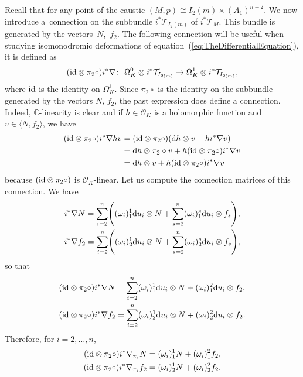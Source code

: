 \documentclass[10pt,a4paper]{amsart}
\numberwithin{equation}{section}
\begin{document}
 Recall that for any point of the caustic $(M,p)\cong I_{2}(m)\times(A_{1})^{n-2}$. We now introduce a~connection on the subbundle $i^{*}\mathcal{T}_{I_{2}(m)}$ of $i^{*}\mathcal{T}_{M}$. This bundle is generated by the vectors~$N$,~$f_{2}$. The following connection will be useful when studying isomonodromic deformations of equation~(\ref{eq:TheDifferentialEquation}), it is defined as
 \begin{equation*}
 ({\rm id}\otimes\pi_{2}\circ)i^{*}\nabla\colon \ \Omega^{0}_{K}\otimes i^{*}\mathcal{T}_{I_{2(m)}}\rightarrow\Omega^{1}_{K}\otimes i^{*}\mathcal{T}_{I_{2(m)}},
 \end{equation*}
 where ${\rm id}$ is the identity on $\Omega^{1}_{K}$. Since $\pi_{2}\circ$ is the identity on the subbundle generated by the vectors $N$, $f_{2}$, the past expression does define a connection. Indeed, $\mathbb{C}$-linearity is clear and if $h\in\mathcal{O}_{K}$ is a holomorphic function and $v\in \langle N,f_{2}\rangle$, we have
 \begin{align*}
 ({\rm id}\otimes\pi_{2}\circ)i^{*}\nabla hv& =({\rm id}\otimes\pi_{2}\circ)({\rm d}h\otimes v+hi^{*}\nabla v)\\
 & ={\rm d}h\otimes\pi_{2}\circ v+h({\rm id}\otimes\pi_{2}\circ)i^{*}\nabla v\\
 & ={\rm d}h\otimes v+h({\rm id}\otimes\pi_{2}\circ)i^{*}\nabla v
 \end{align*}
 because $({\rm id}\otimes\pi_{2}\circ)$ is $\mathcal{O}_{K}$-linear. Let us compute the connection matrices of this connection. We have
 \begin{align*}
 & i^{*}\nabla N=\sum_{i=2}^{n}\Biggl((\omega_{i})_{1}^{1}{\rm d}u_{i}\otimes N+\sum_{s=2}^{n}(\omega_{i})^{s}_{1}{\rm d}u_{i}\otimes f_{s}\Biggr),\\
 & i^{*}\nabla f_{2}=\sum_{i=2}^{n}\Biggl((\omega_{i})_{2}^{1}{\rm d}u_{i}\otimes N+\sum_{s=2}^{n}(\omega_{i})^{s}_{2}{\rm d}u_{i}\otimes f_{s}\Biggr),
 \end{align*}
 so that
 \begin{align*}
 & ({\rm id}\otimes\pi_{2}\circ)i^{*}\nabla N=\sum_{i=2}^{n}(\omega_{i})^{1}_{1}{\rm d}u_{i}\otimes N+(\omega_{i})^{2}_{1}{\rm d}u_{i}\otimes f_{2},\\
 & ({\rm id}\otimes\pi_{2}\circ)i^{*}\nabla f_{2}=\sum_{i=2}^{n}(\omega_{i})^{1}_{2}{\rm d}u_{i}\otimes N+(\omega_{i})^{2}_{2}{\rm d}u_{i}\otimes f_{2}.
 \end{align*}
 Therefore, for $i=2,\dots,n$,
 \begin{equation*}
 \begin{aligned}
 ({\rm id}\otimes\pi_{2}\circ)i^{*}\nabla_{\pi_{i}}N&=(\omega_{i})^{1}_{1}N+(\omega_{i})^{2}_{1}f_{2},\\
 ({\rm id}\otimes\pi_{2}\circ)i^{*}\nabla_{\pi_{i}}f_{2}&=(\omega_{i})^{1}_{2}N+(\omega_{i})^{2}_{2}f_{2}.
 \end{aligned}
 \end{equation*}
\end{document}
